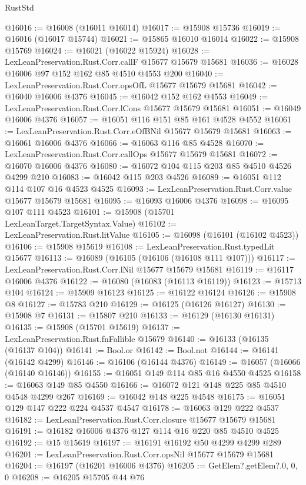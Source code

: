 \begin{lexlean}{RustStd}
\begin{coremodule}
@16016 := @16008 (@16011 @16014)
@16017 := @15908 @15736
@16019 := @16016 (@16017 @15744)
@16021 := @15865 @16010 @16014
@16022 := @15908 @15769
@16024 := @16021 (@16022 @15924)
@16028 := LexLeanPreservation.Rust.Corr.callF @15677 @15679 @15681
@16036 := @16028 @16006 @97 @152 @162 @85 @4510 @4553 @200
@16040 := LexLeanPreservation.Rust.Corr.opsOfL @15677 @15679 @15681
@16042 := @16040 @16006 @4376
@16045 := @16042 @152 @162 @4553
@16049 := LexLeanPreservation.Rust.Corr.lCons @15677 @15679 @15681
@16051 := @16049 @16006 @4376
@16057 := @16051 @116 @151 @85 @161 @4528 @4552
@16061 := LexLeanPreservation.Rust.Corr.eOfBNil @15677 @15679 @15681
@16063 := @16061 @16006 @4376
@16066 := @16063 @116 @85 @4528
@16070 := LexLeanPreservation.Rust.Corr.callOps @15677 @15679 @15681
@16072 := @16070 @16006 @4376
@16080 := @16072 @104 @115 @203 @85 @4510 @4526 @4299 @210
@16083 := @16042 @115 @203 @4526
@16089 := @16051 @112 @114 @107 @16 @4523 @4525
@16093 := LexLeanPreservation.Rust.Corr.value @15677 @15679 @15681
@16095 := @16093 @16006 @4376
@16098 := @16095 @107 @111 @4523
@16101 := @15908 (@15701 LexLeanTarget.TargetSyntax.Value)
@16102 := LexLeanPreservation.Rust.litValue
@16105 := @16098 (@16101 (@16102 @4523))
@16106 := @15908 @15619
@16108 := LexLeanPreservation.Rust.typedLit @15677
@16113 := @16089 (@16105 (@16106 (@16108 @111 @107)))
@16117 := LexLeanPreservation.Rust.Corr.lNil @15677 @15679 @15681
@16119 := @16117 @16006 @4376
@16122 := @16080 (@16083 (@16113 @16119))
@16123 := @15713 @104
@16124 := @15909 @16123
@16125 := @16122 @16124
@16126 := @15908 @8
@16127 := @15783 @210
@16129 := @16125 (@16126 @16127)
@16130 := @15908 @7
@16131 := @15807 @210
@16133 := @16129 (@16130 @16131)
@16135 := @15908 (@15701 @15619)
@16137 := LexLeanPreservation.Rust.fnFallible @15679
@16140 := @16133 (@16135 (@16137 @104))
@16141 := Bool.or
@16142 := Bool.not
@16144 := @16141 (@16142 @4299)
@16146 := @16106 (@16144 @4376)
@16149 := @16057 (@16066 (@16140 @16146))
@16155 := @16051 @149 @114 @85 @16 @4550 @4525
@16158 := @16063 @149 @85 @4550
@16166 := @16072 @121 @148 @225 @85 @4510 @4548 @4299 @267
@16169 := @16042 @148 @225 @4548
@16175 := @16051 @129 @147 @222 @224 @4537 @4547
@16178 := @16063 @129 @222 @4537
@16182 := LexLeanPreservation.Rust.Corr.closure @15677 @15679 @15681
@16191 := @16182 @16006 @4376 @127 @114 @16 @220 @85 @4510 @4525
@16192 := @15 @15619
@16197 := @16191 @16192 @50 @4299 @4299 @289
@16201 := LexLeanPreservation.Rust.Corr.opsNil @15677 @15679 @15681
@16204 := @16197 (@16201 @16006 @4376)
@16205 := GetElem?.getElem?.{0, 0, 0}
@16208 := @16205 @15705 @44 @76

\end{coremodule}
\end{lexlean}
